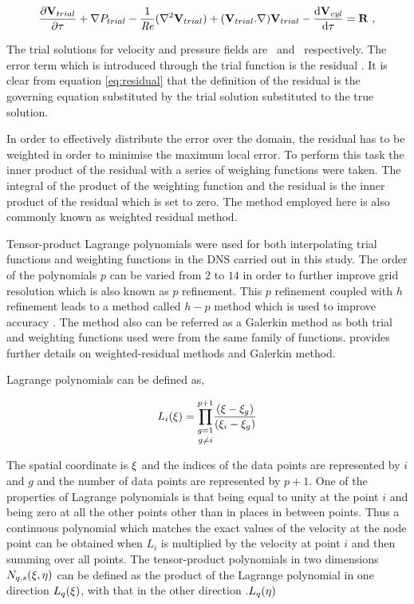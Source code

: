  \begin{equation} \centering
 \label{eq:residual}
 \pderiv{\Vtrial}{\tau} +\grad{\Ptrial} - \frac{1}{\Rey}(\gradsq{\Vtrial}) + (\Vtrial.\nabla)\Vtrial - \accframe = \residual ~,
 \end{equation}
 
 The trial solutions for velocity and pressure fields are \Vtrial\ and \Ptrial\ respectively. The error term which is introduced through the trial function is the residual \residual. It is clear from equation \ref{eq:residual} that the definition of the residual is the governing equation substituted by the trial solution substituted to the true solution.
 
In order to effectively distribute the error over the domain, the residual has to be weighted in order to minimise the maximum local error. To perform this task the inner product of the residual with a series of weighing functions were taken. The integral of the product of the weighting  function and the residual is the inner product of the residual which is set to zero. The method employed here is also commonly known as weighted residual method. 

Tensor-product Lagrange polynomials were used for both interpolating trial functions and weighting functions in the DNS carried out in this study. The order of the polynomials $p$ can be varied from $2$ to $14$ in order to further improve grid resolution which is also known as $p$ refinement. This $p$ refinement coupled with $h$ refinement leads to a method called $h-p$ method which is used to improve accuracy \citep{karniadakis2005}. The method also can be referred as a Galerkin method as both trial and weighting functions used were from the same family of functions. \citet{Fletcher84,Fletcher91} provides further details on weighted-residual methods and Galerkin method. 

Lagrange polynomials can be defined as, 

\begin{equation} \centering
\label{eq:lagrange}
L_{i}(\compone) = \underset{g\neq i}{\prod_{g=1}^{p+1}}\frac{(\compone-\compone_{g})}{(\compone_{i}-\compone_{g})}
\end{equation}

The spatial coordinate is $\xi$ and the indices of the data points are represented by $i$ and $g$ and the number of data points are represented by $p+1$. One of the properties of Lagrange polynomials is that being equal to unity at the point $i$ and being zero at all the other points other than in places in between points. Thus a continuous polynomial which matches the exact values of the velocity at the node point  can be obtained when  $L_{i}$ is multiplied by the velocity at point $i$ and then summing over all points. The tensor-product polynomials in two dimensions $N_{q,s}(\xi, \eta)$ can be defined as the product of the Lagrange polynomial in one direction $L_{q}(\xi)$, with that in the other direction .$L_{q}(\eta)$ 

